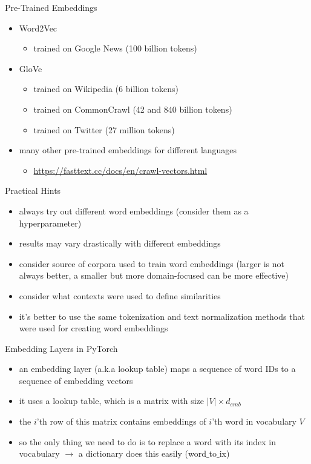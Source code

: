  \begin{frame}{Pre-Trained Embeddings}
\begin{itemize}
    \item Word2Vec
    \begin{itemize}
        \item trained on Google News (100 billion tokens)
    \end{itemize}
    \item GloVe
        \begin{itemize}
            \item trained on Wikipedia (6 billion tokens)
            \item trained on CommonCrawl (42 and 840 billion tokens)
            \item trained on Twitter (27 million tokens)
        \end{itemize}
    \item many other pre-trained embeddings for different languages 
        \begin{itemize}
            \item \url{https://fasttext.cc/docs/en/crawl-vectors.html}
        \end{itemize}
\end{itemize}
\end{frame}

\begin{frame}{Practical Hints}
     \begin{itemize}
         \item<1-> always try out different word embeddings (consider them as a hyperparameter)
         \item<2-> results may vary drastically with different embeddings
         \item<3-> consider source of corpora used to train word embeddings (larger is not always better, a smaller but more domain-focused can be more effective)
         \item<4-> consider what contexts  were used to define similarities 
         \item<5-> it's better to use the same tokenization and text normalization methods that  were used for creating word embeddings
     \end{itemize}
 \end{frame}

\begin{frame}{Embedding Layers in PyTorch}
     \begin{itemize}
         \item<1-> an embedding layer (a.k.a lookup table) maps a sequence of word IDs to a sequence of embedding vectors
         \item<2-> it uses a lookup table, which is a matrix with size $|V|\times d_{emb}$
         \item<3-> the $i$'th row of this matrix contains embeddings of $i$'th word in vocabulary $V$
         \item<4-> so the only thing we need to do is to replace a word with its index in vocabulary $\rightarrow$ a dictionary does this easily (word$\_$to$\_$ix)
     \end{itemize}
\end{frame}

